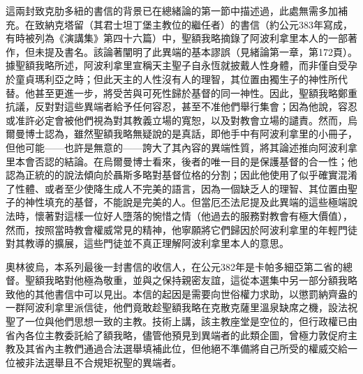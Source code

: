 這兩封致克肋多紐的書信的背景已在總緒論的第一節中描述過，此處無需多加補充。在致納克塔留（其君士坦丁堡主教位的繼任者）的書信（約公元383年寫成，有時被列為《演講集》第四十六篇）中，聖額我略摘錄了阿波利拿里本人的一部著作，但未提及書名。該論著闡明了此異端的基本謬誤（見緒論第一章，第172頁）。據聖額我略所述，阿波利拿里宣稱天主聖子自永恆就披戴人性身體，而非僅自受孕於童貞瑪利亞之時；但此天主的人性沒有人的理智，其位置由獨生子的神性所代替。他甚至更進一步，將受苦與可死性歸於基督的同一神性。因此，聖額我略鄭重抗議，反對對這些異端者給予任何容忍，甚至不准他們舉行集會；因為他說，容忍或准許必定會被他們視為對其教義立場的寬恕，以及對教會立場的譴責。然而，烏爾曼博士認為，雖然聖額我略無疑說的是真話，即他手中有阿波利拿里的小冊子，但他可能——也許是無意的——誇大了其內容的異端性質，將其論述推向阿波利拿里本會否認的結論。在烏爾曼博士看來，後者的唯一目的是保護基督的合一性；他認為正統的的說法傾向於聶斯多略對基督位格的分割；因此他使用了似乎確實混淆了性體、或者至少使降生成人不完美的語言，因為一個缺乏人的理智、其位置由聖子的神性填充的基督，不能說是完美的人。但當厄丕法尼提及此異端的這些極端說法時，懷著對這樣一位好人墮落的惋惜之情（他過去的服務對教會有極大價值），然而，按照當時教會權威常見的精神，他寧願將它們歸因於阿波利拿里的年輕門徒對其教導的擴展，這些門徒並不真正理解阿波利拿里本人的意思。\par

奧林彼烏，本系列最後一封書信的收信人，在公元382年是卡帕多細亞第二省的總督。聖額我略對他極為敬重，並與之保持親密友誼，這從本選集中另一部分額我略致他的其他書信中可以見出。本信的起因是需要向世俗權力求助，以懲罰納齊盎的一群阿波利拿里派信徒，他們竟敢趁聖額我略在克散克薩里溫泉缺席之機，設法祝聖了一位與他們思想一致的主教。技術上講，該主教座堂是空位的，但行政權已由省內各位主教委託給了額我略，儘管他預見到異端者的此類企圖，曾極力敦促府主教及其省內主教們通過合法選舉填補此位，但他絕不準備將自己所受的權威交給一位被非法選舉且不合規矩祝聖的異端者。\par


\subsection{}

